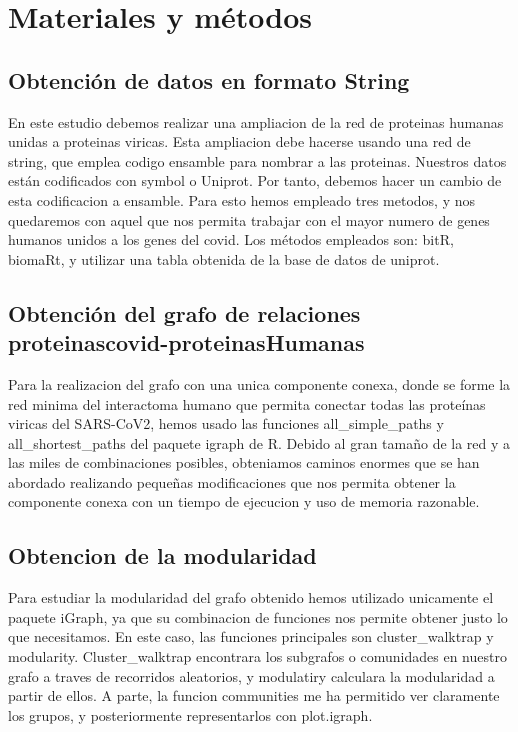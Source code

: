 \section{Materiales y métodos}


\subsection{Obtención de datos en formato String}
En este estudio debemos realizar una ampliacion de la red de proteinas humanas unidas a proteinas viricas.
Esta ampliacion debe hacerse usando una red de string, que emplea codigo ensamble para nombrar a las proteinas.
Nuestros datos están codificados con symbol o Uniprot. Por tanto, debemos hacer un cambio de esta codificacion a ensamble.
Para esto hemos empleado tres metodos, y nos quedaremos con aquel que nos permita trabajar con el mayor numero de genes humanos unidos a los genes del covid.
Los métodos empleados son: bitR, biomaRt, y utilizar una tabla obtenida de la base de datos de uniprot. 

\subsection{Obtención del grafo de relaciones proteinascovid-proteinasHumanas}
Para la realizacion del grafo con una unica componente conexa, donde se forme la red minima del interactoma humano
que permita conectar todas las proteínas viricas del SARS-CoV2, hemos usado las funciones all\_simple\_paths y all\_shortest\_paths 
del paquete igraph de R. Debido al gran tamaño de la red y a las miles de combinaciones posibles, obteniamos caminos enormes que
se han abordado realizando pequeñas modificaciones que nos permita obtener la componente conexa con un tiempo de ejecucion y 
uso de memoria razonable. 

\subsection{Obtencion de la modularidad}
Para estudiar la modularidad del grafo obtenido hemos utilizado unicamente el paquete iGraph, ya que su combinacion de funciones nos permite obtener justo lo que necesitamos.
En este caso, las funciones principales son cluster\_walktrap y modularity. Cluster\_walktrap encontrara los subgrafos o comunidades en nuestro grafo a traves de recorridos aleatorios, y modulatiry calculara la modularidad a partir de ellos. 
A parte, la funcion communities me ha permitido ver claramente los grupos, y posteriormente representarlos con plot.igraph.


